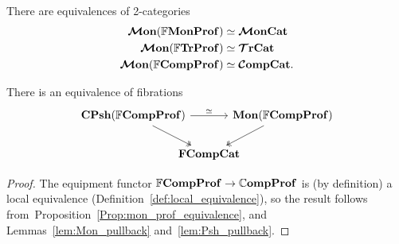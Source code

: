 \documentclass[12pt,oneside,article,draft]{memoir}
\begin{document}
\begin{corollary}\label{cor:TrCat_ObjectFree}
   There are equivalences of 2-categories
   \begin{align*}
      \bm{\mathcal{M}}\mathbf{on}(\mathbb{F}\mathbf{MonProf})&\simeq\bm{\mathcal{M}}\mathbf{onCat} \\
      \bm{\mathcal{M}}\mathbf{on}(\mathbb{F}\mathbf{TrProf})&\simeq\bm{\mathcal{T}}\mathbf{rCat} \\
      \bm{\mathcal{M}}\mathbf{on}(\mathbb{F}\mathbf{CompProf})&\simeq\bm{\mathcal{C}}\mathbf{ompCat}.
   \end{align*}
\end{corollary}

\begin{corollary}\label{cor:FrCompProf_Psh_Mon}
   There is an equivalence of fibrations
   \begin{equation*}
      \begin{tikzcd}[column sep=-1.5em]
         \CPsh(\dFrCompProf) \ar[rr,"\equiv"] \ar[dr,two heads]
            && \Mon(\dFrCompProf) \ar[dl,two heads] \\
            & \FrCompCat &
      \end{tikzcd}
   \end{equation*}
\end{corollary}
\begin{proof}
   The equipment functor $\mathbb{F}\mathbf{CompProf}\to\mathbb{C}\mathbf{ompProf}$ is (by definition) a local equivalence
   (Definition~\ref{def:local_equivalence}), so the result follows from~Proposition~\ref{Prop:mon_prof_equivalence}, and Lemmas~\ref{lem:Mon_pullback} and~\ref{lem:Psh_pullback}.
\end{proof}
\end{document}
